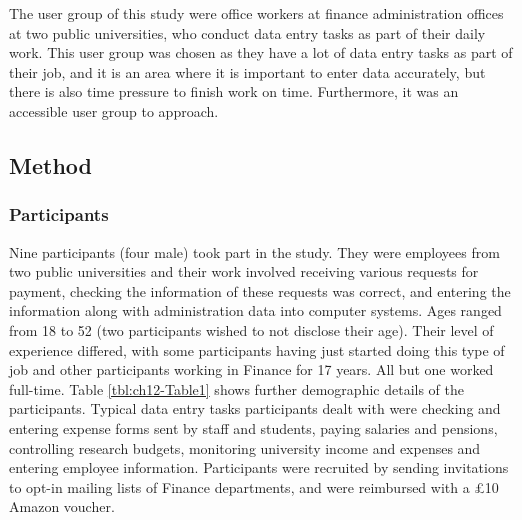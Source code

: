 The user group of this study were office workers at finance administration offices at two public universities, who conduct data entry tasks as part of their daily work.  This user group was chosen as they have a lot of data entry tasks as part of their job, and it is an area where it is important to enter data accurately, but there is also time pressure to finish work on time. Furthermore, it was an accessible user group to approach.

\subsection{Method}
\subsubsection{Participants}
Nine participants (four male) took part in the study. They were employees from two public universities and their work involved receiving various requests for payment, checking the information of these requests was correct, and entering the information along with administration data into computer systems. Ages ranged from 18 to 52 (two participants wished to not disclose their age). Their level of experience differed, with some participants having just started doing this type of job and other participants working in Finance for 17 years. All but one worked full-time. Table \ref{tbl:ch12-Table1} shows further demographic details of the participants. Typical data entry tasks participants dealt with were checking and entering expense forms sent by staff and students, paying salaries and pensions, controlling research budgets, monitoring university income and expenses and entering employee information. Participants were recruited by sending invitations to opt-in mailing lists of Finance departments, and were reimbursed with a \pounds10 Amazon voucher.

